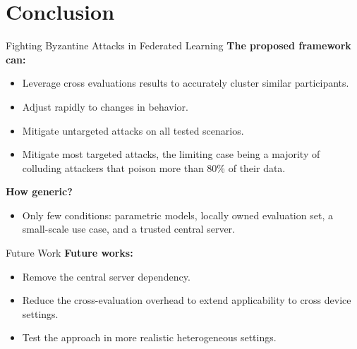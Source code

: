 \section*{Conclusion}

\begin{frame}
  \sectionpage
\end{frame}

\begin{frame}{Fighting Byzantine Attacks in Federated Learning}
  \textbf{The proposed framework can:}
  \begin{itemize}
    \item Leverage cross evaluations results to accurately cluster similar participants.
    \item Adjust rapidly to changes in behavior.
    \item Mitigate untargeted attacks on all tested scenarios. 
    \item Mitigate most targeted attacks, the limiting case being a majority of colluding attackers that poison more than 80\% of their data.
  \end{itemize}

  \pause
  \textbf{How generic?}
  \begin{itemize}
    \item Only few conditions: parametric models, locally owned evaluation set, a \alert<3>{small-scale use case}, and a \alert<3>{trusted central server}.
  \end{itemize}
\end{frame}


\begin{frame}{Future Work}
  \textbf{Future works:}
    \begin{itemize}
      \item Remove the central server dependency.
      \item Reduce the cross-evaluation overhead to extend applicability to cross device settings.
      \item Test the approach in more realistic heterogeneous settings.
    \end{itemize}
\end{frame}


